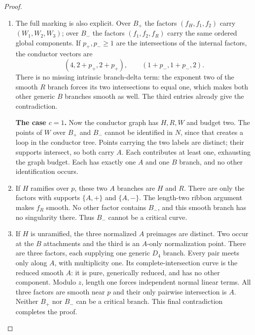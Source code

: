 \begin{proof}
\begin{enumerate}[label={$\langle1\rangle$\arabic*.},leftmargin=*]
\item The full marking is also explicit. Over
$B_+$ the factors $(f_H,f_1,f_2)$ carry
$(W_1,W_2,W_3)$; over $B_-$ the factors
$(f_1,f_2,f_R)$ carry the same ordered
global components. If $p_+,p_-\ge1$ are
the intersections of the internal factors,
the conductor vectors are
\[
         (4,2+p_+,2+p_+),\qquad
         (1+p_-,1+p_-,2).
\]
There is no missing intrinsic branch-delta
term: the exponent two of the smooth $R$
branch forces its two intersections to
equal one, which makes both other generic
$B$ branches smooth as well. The third
entries already give the contradiction.

\par\medskip\noindent\textbf{The case $c=1$.}
Now the conductor graph has $H,R,W$ and
budget two. The points of $W$ over $B_+$
and $B_-$ cannot be identified in $N$,
since that creates a loop in the conductor
tree. Points carrying the two labels are
distinct; their supports intersect, so
both carry $A$. Each contributes at least
one, exhausting the graph budget. Each
has exactly one $A$ and one $B$ branch,
and no other identification occurs.

\item If $H$ ramifies over $p$, these two
$A$ branches are $H$ and $R$. There are
only the factors with supports
$\{A,+\}$ and $\{A,-\}$. The length-two
ribbon argument makes $f_R$ smooth.
No other factor contains $B_-$, and this
smooth branch has no singularity there.
Thus $B_-$ cannot be a critical curve.

\item If $H$ is unramified, the three normalized
$A$ preimages are distinct. Two occur
at the $B$ attachments and the third
is an $A$-only normalization point.
There are three factors, each supplying
one generic $D_4$ branch. Every pair
meets only along $A$, with multiplicity
one. Its complete-intersection curve
is the reduced smooth $A$: it is pure,
generically reduced, and has no other
component. Modulo $z$, length one forces
independent normal linear terms.
All three factors are smooth near $p$
and their only pairwise intersection is
$A$. Neither $B_+$ nor $B_-$ can be a
critical branch. This final contradiction
completes the proof.

\end{enumerate}
\end{proof}
